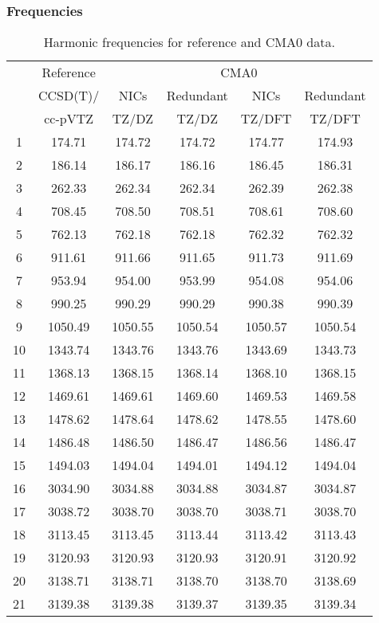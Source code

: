\documentclass[10pt,oneside]{article}
\begin{document}
\begin{table}[h!]
\subsubsection*{Frequencies}
\centering
\caption{Harmonic frequencies for reference and CMA0 data.}
\begin{tabular}{cccccc}
\toprule
{} & Reference & \multicolumn{4}{c}{CMA0} \\
{} &  CCSD(T)/ &    NICs &  Redundant &    NICs & Redundant \\
{} &   cc-pVTZ &   TZ/DZ &      TZ/DZ &  TZ/DFT &    TZ/DFT \\
\midrule
1  &    174.71 &  174.72 &     174.72 &  174.77 &    174.93 \\
2  &    186.14 &  186.17 &     186.16 &  186.45 &    186.31 \\
3  &    262.33 &  262.34 &     262.34 &  262.39 &    262.38 \\
4  &    708.45 &  708.50 &     708.51 &  708.61 &    708.60 \\
5  &    762.13 &  762.18 &     762.18 &  762.32 &    762.32 \\
6  &    911.61 &  911.66 &     911.65 &  911.73 &    911.69 \\
7  &    953.94 &  954.00 &     953.99 &  954.08 &    954.06 \\
8  &    990.25 &  990.29 &     990.29 &  990.38 &    990.39 \\
9  &   1050.49 & 1050.55 &    1050.54 & 1050.57 &   1050.54 \\
10 &   1343.74 & 1343.76 &    1343.76 & 1343.69 &   1343.73 \\
11 &   1368.13 & 1368.15 &    1368.14 & 1368.10 &   1368.15 \\
12 &   1469.61 & 1469.61 &    1469.60 & 1469.53 &   1469.58 \\
13 &   1478.62 & 1478.64 &    1478.62 & 1478.55 &   1478.60 \\
14 &   1486.48 & 1486.50 &    1486.47 & 1486.56 &   1486.47 \\
15 &   1494.03 & 1494.04 &    1494.01 & 1494.12 &   1494.04 \\
16 &   3034.90 & 3034.88 &    3034.88 & 3034.87 &   3034.87 \\
17 &   3038.72 & 3038.70 &    3038.70 & 3038.71 &   3038.70 \\
18 &   3113.45 & 3113.45 &    3113.44 & 3113.42 &   3113.43 \\
19 &   3120.93 & 3120.93 &    3120.93 & 3120.91 &   3120.92 \\
20 &   3138.71 & 3138.71 &    3138.70 & 3138.70 &   3138.69 \\
21 &   3139.38 & 3139.38 &    3139.37 & 3139.35 &   3139.34 \\
\bottomrule
\end{tabular}
\end{table}
\end{document}
